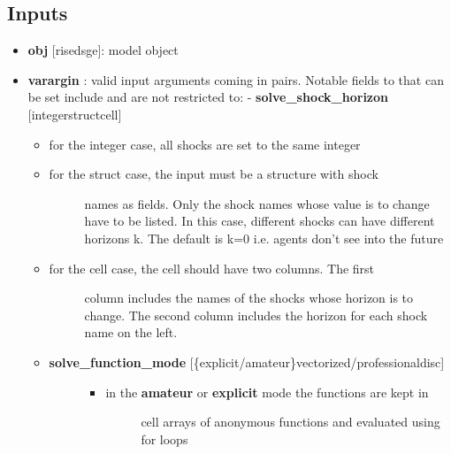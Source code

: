 \documentclass[letterpaper,10pt,english]{sphinxmanual}
\begin{document}
\subsection{Inputs}
\label{classes/models/@dsge/dsge:id160}\begin{itemize}
\item {} 
\textbf{obj} {[}rise\textbar{}dsge{]}: model object

\item {} 
\textbf{varargin} : valid input arguments coming in pairs. Notable fields to
that can be set include and are not restricted to:
- \textbf{solve\_shock\_horizon} {[}integer\textbar{}struct\textbar{}cell{]}
\begin{itemize}
\item {} 
for the integer case, all shocks are set to the same integer

\item {} \begin{description}
\item[{for the struct case, the input must be a structure with shock}] \leavevmode
names as fields. Only the shock names whose value is to change
have to be listed. In this case, different shocks can have
different horizons k. The default is k=0 i.e. agents don't
see into the future

\end{description}

\item {} \begin{description}
\item[{for the cell case, the cell should have two columns. The first}] \leavevmode
column includes the names of the shocks whose horizon is to
change. The second column includes the horizon for each shock
name on the left.

\end{description}

\end{itemize}
\begin{itemize}
\item {} \begin{description}
\item[{\textbf{solve\_function\_mode} {[}\{explicit/amateur\}\textbar{}vectorized/professional\textbar{}disc{]}}] \leavevmode\begin{itemize}
\item {} \begin{description}
\item[{in the \textbf{amateur} or \textbf{explicit} mode the functions are kept in}] \leavevmode
cell arrays of anonymous functions and evaluated using for
loops


\end{description}
\end{itemize}
\end{description}
\end{itemize}
\end{itemize}
\end{document}
